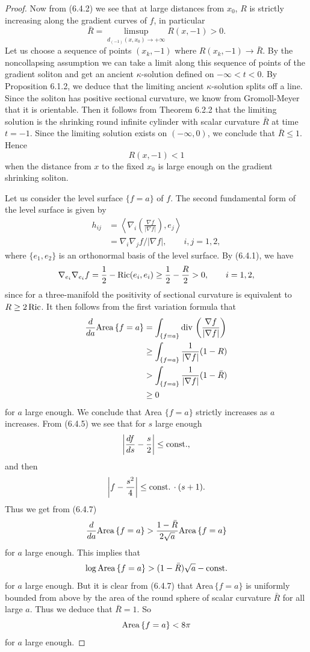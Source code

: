 \begin{proof}
Now from (6.4.2) we see that at large distances from $x_0$, $R$ is
strictly increasing along the gradient curves of $f$, in
particular
$$
\bar{R}=\limsup_{d_{(-1)}(x,x_0)\rightarrow+\infty}R(x,-1)>0.
$$
Let us choose a sequence of points $(x_k,-1)$ where
$R(x_k,-1)\rightarrow\bar{R}$. By the noncollapsing assumption we
can take a limit along this sequence of points of the gradient
soliton and get an ancient $\kappa$-solution defined on
$-\infty<t<0$. By Proposition 6.1.2, we deduce that the limiting
ancient $\kappa$-solution splits off a line. Since the soliton has
positive sectional curvature, we know from Gromoll-Meyer \cite{GM}
that it is orientable. Then it follows from Theorem 6.2.2 that the
limiting solution is the shrinking round infinite cylinder with
scalar curvature $\bar{R}$ at time $t=-1$. Since the limiting
solution exists on $(-\infty,0)$, we conclude that $\bar{R}\le 1$.
Hence
$$
R(x,-1)< 1
$$
when the distance from $x$ to the fixed $x_0$ is large enough on
the gradient shrinking soliton.

Let us consider the level surface $\{f=a\}$ of $f$. The second
fundamental form of the level surface is given by
\begin{align*}
h_{ij}&  = \left\langle\nabla_i\left(\frac{\nabla f}{|\nabla
f|}\right),e_j\right\rangle\\
&  = \nabla_i\nabla_j f/|\nabla f|,\qquad i,j=1,2,
\end{align*}
where $\{e_1,e_2\}$ is an orthonormal basis of the level surface.
By (6.4.1), we have
$$
\nabla_{e_i}\nabla_{e_i}f =\frac{1}{2}-\operatorname{Ric}(e_i,e_i)
\ge\frac{1}{2}-\frac{R}{2}>0,\qquad i=1,2,
$$
since for a three-manifold the positivity of sectional curvature
is equivalent to $R\ge 2\operatorname{Ric}$. It then follows from the first
variation formula that
\begin{align}
\frac{d}{da}{\rm Area}\,\{f=a\}
& = \int_{\{f=a\}}{\rm div}\,\left(\frac{\nabla f}{|\nabla f|}\right)\\
&  \ge \int_{\{f=a\}}\frac{1}{|\nabla f|}(1-R)\nonumber\\
&  > \int_{\{f=a\}}\frac{1}{|\nabla f|}(1-\bar{R})\nonumber\\
&  \ge 0\nonumber
\end{align}     %
for $a$ large enough. We conclude that Area $\{f=a\}$ strictly
increases as $a$ increases. From (6.4.5) we see that for $s$ large
enough
$$
\left|\frac{df}{ds}-\frac{s}{2}\right|\le{\rm const.},
$$
and then
$$
\left|f-\frac{s^2}{4}\right|\le {\rm const.}\,\cdot(s+1).
$$
Thus we get from (6.4.7)
$$
\frac{d}{da}{\rm Area}\,\{f=a\}
>\frac{1-\bar{R}}{2\sqrt{a}}{\rm Area}\,\{f=a\}
$$
for $a$ large enough. This implies that
$$
\log {\rm Area}\,\{f=a\}>(1-\bar{R})\sqrt{a}-{\rm const.}
$$
for $a$ large enough. But it is clear from (6.4.7) that
Area$\,\{f=a\}$ is uniformly bounded from above by the area of the
round sphere of scalar curvature $\bar{R}$ for all large $a$. Thus
we deduce that $\bar{R}=1$. So \begin{equation}
{\rm Area}\,\{f=a\}<8\pi  %
\end{equation} for $a$ large enough.


\end{proof}
